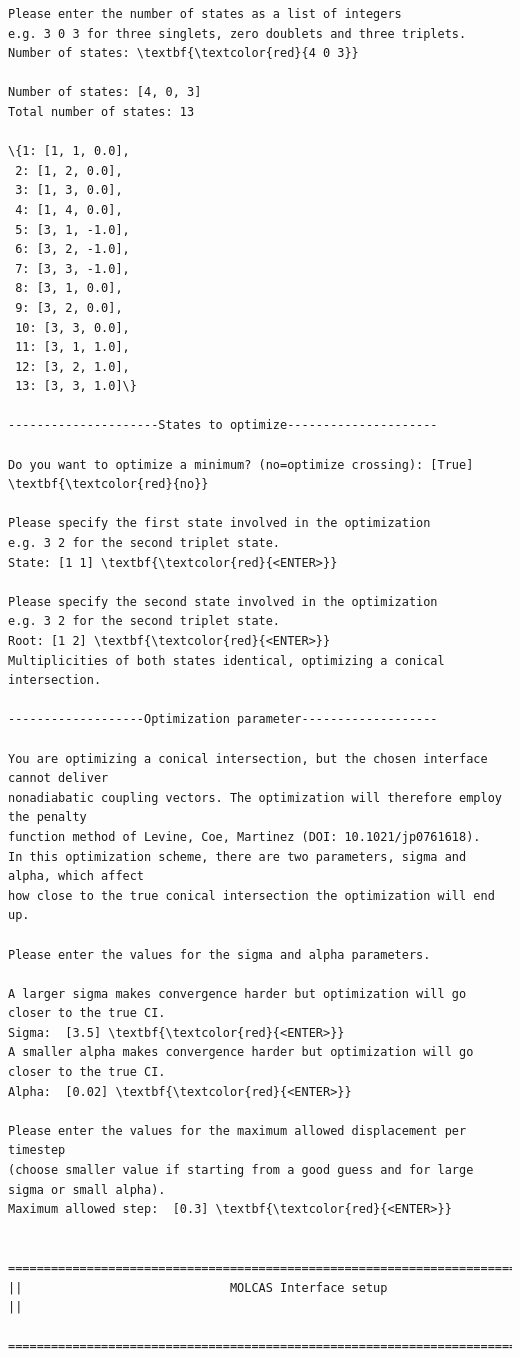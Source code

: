 \documentclass[a4paper,11pt,DIV=15,openany]{scrbook}
\begin{document}
\begin{oframed}
\begin{Verbatim}[commandchars=\\\{\}]
Please enter the number of states as a list of integers
e.g. 3 0 3 for three singlets, zero doublets and three triplets.
Number of states: \textbf{\textcolor{red}{4 0 3}}

Number of states: [4, 0, 3]
Total number of states: 13

\{1: [1, 1, 0.0],
 2: [1, 2, 0.0],
 3: [1, 3, 0.0],
 4: [1, 4, 0.0],
 5: [3, 1, -1.0],
 6: [3, 2, -1.0],
 7: [3, 3, -1.0],
 8: [3, 1, 0.0],
 9: [3, 2, 0.0],
 10: [3, 3, 0.0],
 11: [3, 1, 1.0],
 12: [3, 2, 1.0],
 13: [3, 3, 1.0]\}

---------------------States to optimize---------------------

Do you want to optimize a minimum? (no=optimize crossing): [True] \textbf{\textcolor{red}{no}}

Please specify the first state involved in the optimization
e.g. 3 2 for the second triplet state.
State: [1 1] \textbf{\textcolor{red}{<ENTER>}}

Please specify the second state involved in the optimization
e.g. 3 2 for the second triplet state.
Root: [1 2] \textbf{\textcolor{red}{<ENTER>}}
Multiplicities of both states identical, optimizing a conical intersection.

-------------------Optimization parameter-------------------

You are optimizing a conical intersection, but the chosen interface cannot deliver 
nonadiabatic coupling vectors. The optimization will therefore employ the penalty 
function method of Levine, Coe, Martinez (DOI: 10.1021/jp0761618).
In this optimization scheme, there are two parameters, sigma and alpha, which affect 
how close to the true conical intersection the optimization will end up.

Please enter the values for the sigma and alpha parameters.

A larger sigma makes convergence harder but optimization will go closer to the true CI.
Sigma:  [3.5] \textbf{\textcolor{red}{<ENTER>}}
A smaller alpha makes convergence harder but optimization will go closer to the true CI.
Alpha:  [0.02] \textbf{\textcolor{red}{<ENTER>}}

Please enter the values for the maximum allowed displacement per timestep 
(choose smaller value if starting from a good guess and for large sigma or small alpha).
Maximum allowed step:  [0.3] \textbf{\textcolor{red}{<ENTER>}}

  ================================================================================
||                             MOLCAS Interface setup                             ||
  ================================================================================


\end{Verbatim}
\end{oframed}
\end{document}
